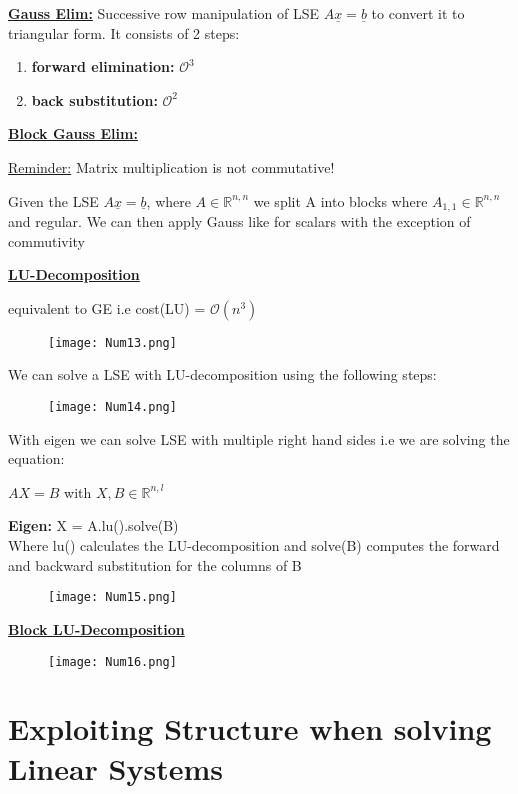 \documentclass[8pt]{extreport}
\begin{document}
\underline{\textbf{Gauss Elim:}} Successive row manipulation of LSE $A\underline{x} = \underline{b}$ to convert it to triangular form. It consists of 2 steps:
\begin{enumerate}
\item \textbf{forward elimination:} $\mathcal{O}^3$
\item \textbf{back substitution:} $\mathcal{O}^2$
\end{enumerate}  


\underline{\textbf{Block Gauss Elim:}}

\underline{Reminder:} Matrix multiplication is not commutative!

Given the LSE $A\underline{x} = \underline{b}$, where $A \in \mathbb{R}^{n,n}$ we split A into blocks where $A_{1,1} \in \mathbb{R}^{n,n}$ and regular. We can then apply Gauss like for scalars with the exception of commutivity

\underline{\textbf{LU-Decomposition}}

equivalent to GE i.e cost(LU) = $\mathcal{O}(n^3)$

\begin{figure}[H]
\centering
\texttt{[image: Num13.png]}
\end{figure}

We can solve a LSE with LU-decomposition using the following steps:
\begin{figure}[H]
\centering
\texttt{[image: Num14.png]}
\end{figure}

With eigen we can solve LSE with multiple right hand sides i.e we are solving the equation:
\begin{center}
$AX = B$ with $X,B \in \mathbb{R}^{n,l}$
\end{center}

\textbf{Eigen:} X = A.lu().solve(B)\\
Where lu() calculates the LU-decomposition and solve(B) computes the forward and backward substitution for the columns of B
\begin{figure}[H]
\centering
\texttt{[image: Num15.png]}
\end{figure}

\underline{\textbf{Block LU-Decomposition}}
\begin{figure}[H]
\centering
\texttt{[image: Num16.png]}
\end{figure}

\section{Exploiting Structure when solving Linear Systems}
\end{document}
